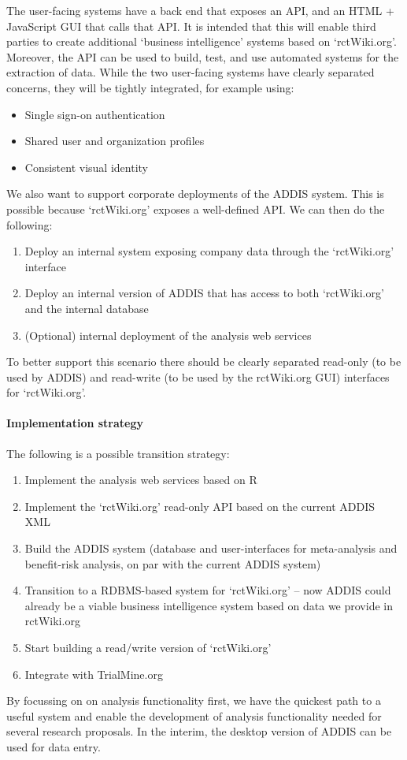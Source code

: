 \documentclass[a4paper]{article}
\begin{document}
The user-facing systems have a back end that exposes an API, and an HTML + JavaScript GUI that calls that API.
It is intended that this will enable third parties to create additional `business intelligence' systems based on `rctWiki.org'.
Moreover, the API can be used to build, test, and use automated systems for the extraction of data.
While the two user-facing systems have clearly separated concerns, they will be tightly integrated, for example using:
\begin{itemize}
\item Single sign-on authentication
\item Shared user and organization profiles
\item Consistent visual identity
\end{itemize}

We also want to support corporate deployments of the ADDIS system. This is possible because `rctWiki.org' exposes a well-defined API. We can then do the following:
\begin{enumerate}
\item Deploy an internal system exposing company data through the `rctWiki.org' interface
\item Deploy an internal version of ADDIS that has access to both `rctWiki.org' and the internal database
\item (Optional) internal deployment of the analysis web services
\end{enumerate}
To better support this scenario there should be clearly separated read-only (to be used by ADDIS) and read-write (to be used by the rctWiki.org GUI) interfaces for `rctWiki.org'.

\paragraph{Implementation strategy}
The following is a possible transition strategy:
\begin{enumerate}
\item Implement the analysis web services based on R
\item Implement the `rctWiki.org' read-only API based on the current ADDIS XML
\item Build the ADDIS system (database and user-interfaces for meta-analysis and benefit-risk analysis, on par with the current ADDIS system)
\item Transition to a RDBMS-based system for `rctWiki.org' -- now ADDIS could already be a viable business intelligence system based on data we provide in rctWiki.org
\item Start building a read/write version of `rctWiki.org'
\item Integrate with TrialMine.org
\end{enumerate}
By focussing on on analysis functionality first, we have the quickest path to a useful system and enable the development of analysis functionality needed for several research proposals.
In the interim, the desktop version of ADDIS can be used for data entry.
\end{document}

